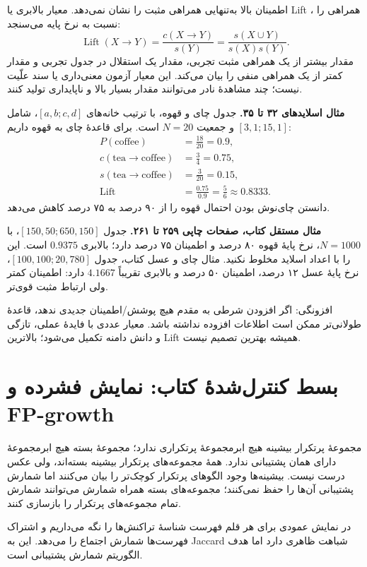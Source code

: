 \documentclass[12pt,a4paper,oneside]{report}
\newcounter{ex}[chapter]
\begin{document}
اطمینان بالا به‌تنهایی همراهی مثبت را نشان نمی‌دهد. معیار بالابری یا Lift ، همراهی را نسبت به نرخ پایه می‌سنجد:
\[\operatorname{Lift}(X\to Y)=\frac{c(X\to Y)}{s(Y)}=\frac{s(X\cup Y)}{s(X)s(Y)}.\]
مقدار بیشتر از یک همراهی مثبت تجربی، مقدار یک استقلال در جدول تجربی و مقدار کمتر از یک همراهی منفی را بیان می‌کند. این معیار آزمون معنی‌داری یا سند علّیت نیست؛ چند مشاهدهٔ نادر می‌توانند مقدار بسیار بالا و ناپایداری تولید کنند.

\textbf{مثال اسلایدهای ۳۲ تا ۳۵.} جدول چای و قهوه، با ترتیب خانه‌های $[a,b;c,d]$، شامل $[3,1;15,1]$ و جمعیت $N=20$ است. برای قاعدهٔ چای به قهوه داریم:
\begin{align*}
P(\mathrm{coffee})&=\frac{18}{20}=0.9,\\
c(\mathrm{tea}\to\mathrm{coffee})&=\frac34=0.75,\\
s(\mathrm{tea}\to\mathrm{coffee})&=\frac3{20}=0.15,\\
\operatorname{Lift}&=\frac{0.75}{0.9}=\frac56\approx0.8333.
\end{align*}
دانستن چای‌نوش بودن احتمال قهوه را از ۹۰ درصد به ۷۵ درصد کاهش می‌دهد.

\textbf{مثال مستقل کتاب، صفحات چاپی ۲۵۹ تا ۲۶۱.} جدول $[150,50;650,150]$، با $N=1000$، نرخ پایهٔ قهوه ۸۰ درصد و اطمینان ۷۵ درصد دارد؛ بالابری $0.9375$ است. این را با اعداد اسلاید مخلوط نکنید. مثال چای و عسل کتاب، جدول $[100,100;20,780]$، نرخ پایهٔ عسل ۱۲ درصد، اطمینان ۵۰ درصد و بالابری تقریباً $4.1667$ دارد: اطمینان کمتر ولی ارتباط مثبت قوی‌تر.

افزونگی: اگر افزودن شرطی به مقدم هیچ پوشش/اطمینان جدیدی ندهد، قاعدهٔ طولانی‌تر ممکن است اطلاعات افزوده نداشته باشد. معیار عددی با فایدهٔ عملی، تازگی و دانش دامنه تکمیل می‌شود؛ بالاترین Lift همیشه بهترین تصمیم نیست.

\section{بسط کنترل‌شدهٔ کتاب: نمایش فشرده و FP-growth}

مجموعهٔ پرتکرار بیشینه هیچ ابرمجموعهٔ پرتکراری ندارد؛ مجموعهٔ بسته هیچ ابرمجموعهٔ دارای همان پشتیبانی ندارد. همهٔ مجموعه‌های پرتکرار بیشینه بسته‌اند، ولی عکس درست نیست. بیشینه‌ها وجود الگوهای پرتکرار کوچک‌تر را بیان می‌کنند اما شمارش پشتیبانی آن‌ها را حفظ نمی‌کنند؛ مجموعه‌های بسته همراه شمارش می‌توانند شمارش تمام مجموعه‌های پرتکرار را بازسازی کنند.

در نمایش عمودی برای هر قلم فهرست شناسهٔ تراکنش‌ها را نگه می‌داریم و اشتراک فهرست‌ها شمارش اجتماع را می‌دهد. این به Jaccard شباهت ظاهری دارد اما هدف الگوریتم شمارش پشتیبانی است.
\end{document}
